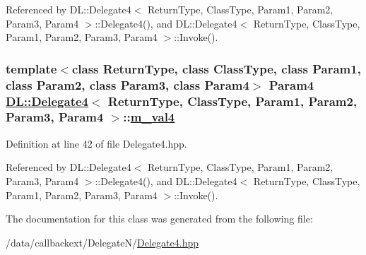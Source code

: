 Referenced by DL::Delegate4$<$ Return\-Type, Class\-Type, Param1, Param2, Param3, Param4 $>$::Delegate4(), and DL::Delegate4$<$ Return\-Type, Class\-Type, Param1, Param2, Param3, Param4 $>$::Invoke().\hypertarget{classDL_1_1Delegate4_r5}{
\subsubsection[m\_\-val4]{\setlength{\rightskip}{0pt plus 5cm}template$<$class Return\-Type, class Class\-Type, class Param1, class Param2, class Param3, class Param4$>$ Param4 \hyperlink{classDL_1_1Delegate4}{DL::Delegate4}$<$ Return\-Type, Class\-Type, Param1, Param2, Param3, Param4 $>$::\hyperlink{classDL_1_1Delegate4_r5}{m\_\-val4}}}
\label{classDL_1_1Delegate4_r5}




Definition at line 42 of file Delegate4.hpp.

Referenced by DL::Delegate4$<$ Return\-Type, Class\-Type, Param1, Param2, Param3, Param4 $>$::Delegate4(), and DL::Delegate4$<$ Return\-Type, Class\-Type, Param1, Param2, Param3, Param4 $>$::Invoke().

The documentation for this class was generated from the following file:\begin{CompactItemize}
\item 
/data/callbackext/Delegate\-N/\hyperlink{Delegate4_8hpp}{Delegate4.hpp}\end{CompactItemize}
